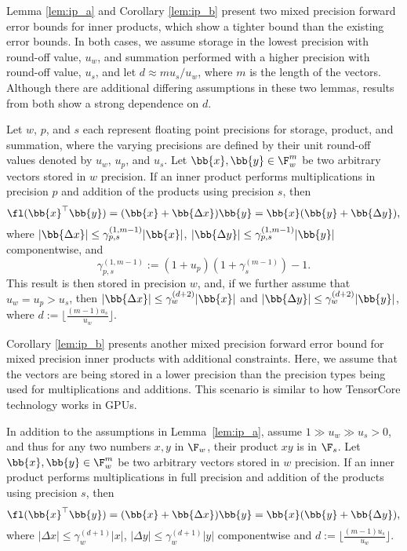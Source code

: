Lemma \ref{lem:ip_a} and Corollary \ref{lem:ip_b} present two mixed precision forward error bounds for inner products, which show a tighter bound than the existing error bounds. 
In both cases, we assume storage in the lowest precision with round-off value, $u_w$, and summation performed with a higher precision with round-off value, $u_s$, and let $d \approx m u_s / u_w$,
where $m$ is the length of the vectors. 
Although there are additional differing assumptions in these two lemmas, results from both show a strong dependence on $d$.
\begin{lemma}
	\label{lem:ip_a}
	Let $w$, $p$, and $s$ each represent floating point precisions for storage, product, and summation, where the varying precisions are defined by their unit round-off values denoted by $u_w$, $u_p$, and $u_s$.
	Let $\bb{x},\bb{y}\in \F_w^{m}$ be two arbitrary vectors stored in $w$ precision.
	If an inner product performs multiplications in precision $p$ and addition of the products using precision $s$, then
	\begin{equation}
	\fl(\bb{x}^{\top}\bb{y}) = (\bb{x}+\bb{\Delta x}) \bb{y} = \bb{x}(\bb{y}+\bb{\Delta y}),
	\end{equation}
	where $|\bb{\Delta x}|\leq \gamma_{p,s}^{(1,m-1)}|\bb{x}|$, $|\bb{\Delta y}|\leq \gamma_{p,s}^{(1,m-1)}|\bb{y}|$ componentwise, and $$\gamma_{p,s}^{(1,m-1)} := (1+u_p)(1+\gamma_s^{(m-1)})-1.$$
	This result is then stored in precision $w$, and, if we further assume that $u_w=u_p>u_s$, then $|\bb{\Delta x}|\leq \gamma_w^{(d+2)}|\bb{x}|$ and $|\bb{\Delta y}|\leq \gamma_w^{(d+2)}|\bb{y}|$, where $d:=\lfloor\frac{(m-1)u_s}{u_w}\rfloor$.
\end{lemma}

Corollary \ref{lem:ip_b} presents another mixed precision forward error bound for mixed precision inner products with additional constraints.
Here, we assume that the vectors are being stored in a lower precision than the precision types being used for multiplications and additions.
This scenario is similar to how TensorCore technology works in GPUs.

\begin{corollary}
	\label{lem:ip_b}
	In addition to the assumptions in Lemma~\ref{lem:ip_a}, assume $1\gg u_w \gg u_s>0$, and thus for any two numbers $x,y$ in $\F_w$, their product $xy$ is in $\F_s$.
	Let $\bb{x},\bb{y}\in \F_w^m$ be two arbitrary vectors stored in $w$ precision.
	If an inner product performs multiplications in full precision and addition of the products using precision $s$, then
	\begin{equation}
	\fl(\bb{x}^{\top}\bb{y}) = (\bb{x}+\bb{\Delta x}) \bb{y} = \bb{x}(\bb{y}+\bb{\Delta y}),
	\end{equation}
	where $|\Delta x|\leq \gamma_w^{(d+1)}|x|$, $|\Delta y|\leq \gamma_w^{(d+1)}|y|$ componentwise and $d:=\lfloor\frac{(m-1)u_s}{u_w}\rfloor$.
\end{corollary}

